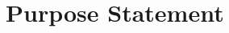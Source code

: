 \documentclass[
    a4paper,            %
    11pt,               %
    stu,                %
    donotrepeattitle,   %
    noextraspace,       %
    floatsintext,       %
    biblatex,           %
    colorlinks=true,        %
    linkcolor=red,          %
    anchorcolor=black,      %
    citecolor=blue,         %
    urlcolor=blue,          %
    bookmarks=true,         %
    bookmarksopen=false,    %
    bookmarksnumbered=true  %
]{apa7}
\begin{document}


\section{Purpose Statement}

\end{document}
